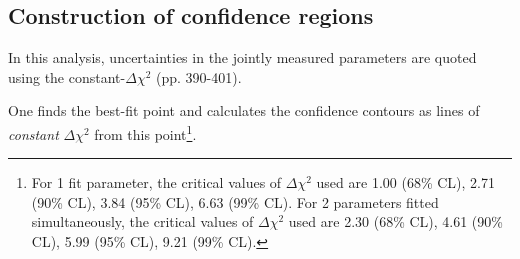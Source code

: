 
\subsection {Construction of confidence regions}
\label{sec:contour_construction}

In this analysis, uncertainties in the jointly measured parameters are quoted using
the constant-$\Delta\chi^{2}$ \cite{PDG2012} (pp. 390-401).


One finds the best-fit point and calculates the confidence contours as lines of \emph{constant} $\Delta{\chi^{2}}$
from this point\footnote{
For 1 fit parameter, the critical values of $\Delta{\chi^{2}}$ used are
1.00 (68\% CL), 2.71 (90\% CL), 3.84 (95\% CL), 6.63 (99\% CL).
For 2 parameters fitted simultaneously, the critical values of $\Delta{\chi^{2}}$ used are
2.30 (68\% CL), 4.61 (90\% CL), 5.99 (95\% CL), 9.21 (99\% CL).
}.

